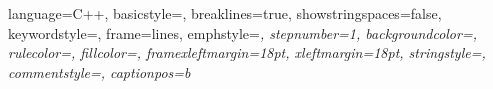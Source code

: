 
{
  language=C++,
  basicstyle=\ttfamily,
  breaklines=true,
  showstringspaces=false,
  keywordstyle=\color{Mulberry},
  frame=lines,
  emphstyle=\itshape,
  stepnumber=1,
  backgroundcolor=\color{blue!10},
  rulecolor=\color{blue!50},
  fillcolor=\color{blue!20},
  framexleftmargin=18pt,
  xleftmargin=18pt,
  stringstyle=\color{BrickRed},
  commentstyle=\color{BrickRed},
  captionpos=b
}
